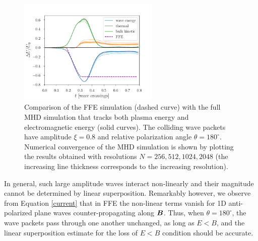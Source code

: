 %
\begin{figure}[h]
\centering
\includegraphics[width=0.6\textwidth]{pics/chap4/alfven180_deltaB08_single_collision.pdf}
\caption[Comparison of the FFE simulation with the full MHD simulation]{
Comparison of the FFE simulation (dashed curve) with the full MHD simulation that tracks both plasma energy and electromagnetic energy (solid curves). The colliding \alfven wave packets have amplitude $\xi=0.8$ and relative polarization angle $\theta = 180^\circ$. Numerical convergence of the MHD simulation is shown by plotting the results obtained with resolutions $N=256,512,1024,2048$ (the increasing line thickness corresponds to the increasing resolution).
}
\label{rmhd}
\end{figure}

In general, such large amplitude waves interact non-linearly and their magnitude cannot be determined by linear superposition. Remarkably however, we observe from Equation \ref{current} that in FFE the non-linear terms vanish for 1D anti-polarized plane waves counter-propagating along $\boldsymbol{B}$. 
Thus, when $\theta = 180^\circ$, the wave packets pass through one another unchanged, as long as $E<B$, and the linear superposition estimate for the loss of $E<B$ condition should be accurate.

